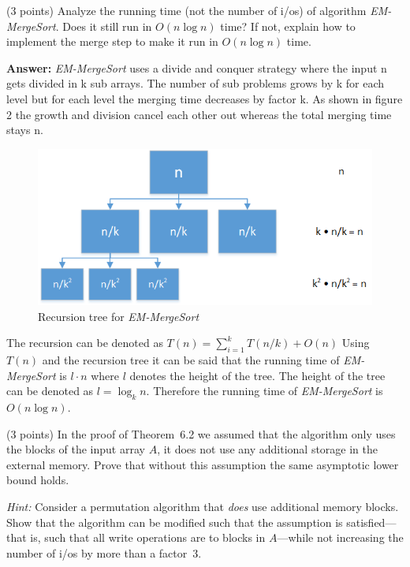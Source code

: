 \documentclass{article}
\newcommand{\io}{{\sc i/o}\xspace}
\newcommand{\ios}{{\io}s\xspace}
\newcounter{rcounter}
\newenvironment{rlist}%
{\begin{list}{\setnr-\arabic{rcounter}}{\usecounter{rcounter}}}{\end{list}}
\begin{document}
\begin{rlist}
        \item (3 points)
        Analyze the running time (not the number of \ios) of algorithm \emph{EM-MergeSort}. Does it still run in $O(n\log n)$ time? If not, explain how to implement the merge step to make it run in $O(n\log n)$ time.
        
        \textbf{Answer:}
        \emph{EM-MergeSort} uses a divide and conquer strategy where the input n gets divided in k sub arrays. The number of sub problems grows by k for each level but for each level the merging time decreases by factor k. As shown in figure 2 the growth and division cancel each other out whereas the total merging time stays n. 
        \begin{figure}[H]
            \includegraphics[scale=1.00]{figs/IO_II_3.png}
            \caption{Recursion tree for \emph{EM-MergeSort}}
            \label{fig:io-ii-3}
        \end{figure}
        The recursion can be denoted as $T(n) = \sum\limits_{i=1}^k T(n/k) + O(n)$
        Using $T(n)$ and the recursion tree it can be said that the running time of \emph{EM-MergeSort} is $l \cdot n$ where $l$ denotes the height of the tree. The height of the tree can be denoted as $l = \log_k n$. Therefore the running time of \emph{EM-MergeSort} is  $O(n\log n)$.
        
        \item(3 points)
        In the proof of Theorem~6.2 we assumed that the algorithm only uses the blocks of the input array $A$, it does not use any additional storage in the external memory. Prove that without this assumption the same asymptotic lower bound holds.
        
        \emph{Hint:} Consider a permutation algorithm that \emph{does} use additional memory blocks. Show that the algorithm can be modified such that the assumption is satisfied---that is, such that all write operations are to blocks in $A$---while not increasing the number of \ios by more than a factor~3.
        

\end{rlist}
\end{document}
